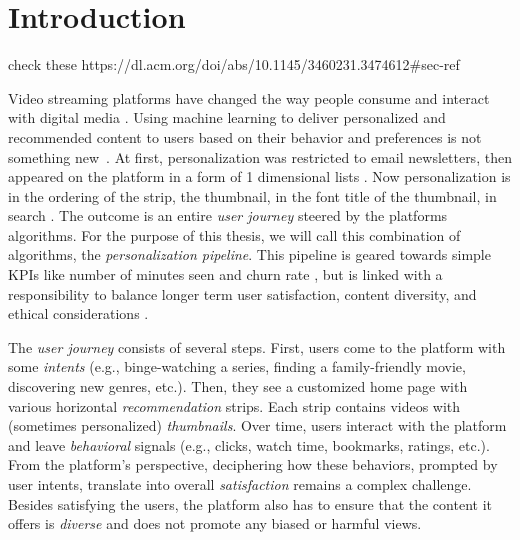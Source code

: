 
\chapter{Introduction}
\label{chapter:introduction}


check these https://dl.acm.org/doi/abs/10.1145/3460231.3474612\#sec-ref \tocite{}

Video streaming platforms have changed the way people consume and interact with digital media \tocite{}. Using machine learning to deliver personalized and recommended content to users based on their behavior and preferences is not something new~\cite{oldPersonalizationBehavior, oldPersonalizationSearch}. At first, personalization was restricted to email newsletters, then appeared on the platform in a form of 1 dimensional lists \tocite{}. Now personalization is in the ordering of the strip, the thumbnail, in the font title of the thumbnail, in search \tocite{}. The outcome is an entire \emph{user journey} steered by the platforms algorithms. For the purpose of this thesis, we will call this combination of algorithms, the \emph{personalization pipeline}. This pipeline is geared towards simple KPIs like number of minutes seen \tocite{} and churn rate \tocite{}, but is linked with a responsibility to balance longer term user satisfaction, content diversity, and ethical considerations \tocite{}.

The \emph{user journey} consists of several steps. First, users come to the platform with some \emph{intents} (e.g., binge-watching a series, finding a family-friendly movie, discovering new genres, etc.). Then, they see a customized home page with various horizontal \emph{recommendation} strips. Each strip contains videos with (sometimes personalized) \emph{thumbnails}. Over time, users interact with the platform and leave \emph{behavioral} signals (e.g., clicks, watch time, bookmarks, ratings, etc.). From the platform's perspective, deciphering how these behaviors, prompted by user intents, translate into overall \emph{satisfaction} remains a complex challenge. Besides satisfying the users, the platform also has to ensure that the content it offers is \emph{diverse} and does not promote any biased or harmful views.

